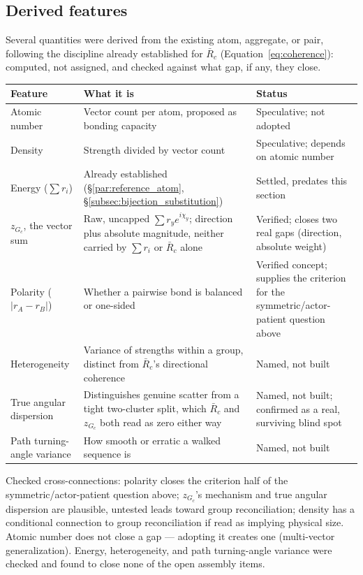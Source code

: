 \documentclass[12pt, a4paper]{article}
\begin{document}
\subsection{Derived features}
\label{subsec:assembly_features}
Several quantities were derived from the existing atom, aggregate,
or pair, following the discipline already established for $\bar
R_c$ (Equation~\eqref{eq:coherence}): computed, not assigned, and
checked against what gap, if any, they close.

\begin{center}
\begin{tabular}{lp{6.5cm}l}
\hline
Feature & What it is & Status \\
\hline
Atomic number &
  Vector count per atom, proposed as bonding capacity &
  Speculative; not adopted \\
Density &
  Strength divided by vector count &
  Speculative; depends on atomic number \\
Energy ($\sum r_i$) &
  Already established
  (\S\ref{par:reference_atom}, \S\ref{subsec:bijection_substitution}) &
  Settled, predates this section \\
$z_{G_c}$, the vector sum &
  Raw, uncapped $\sum r_y e^{i\chi_y}$; direction plus absolute
  magnitude, neither carried by $\sum r_i$ or $\bar R_c$ alone &
  Verified; closes two real gaps (direction, absolute weight) \\
Polarity ($\lvert r_A-r_B\rvert$) &
  Whether a pairwise bond is balanced or one-sided &
  Verified concept; supplies the criterion for the
  symmetric/actor-patient question above \\
Heterogeneity &
  Variance of strengths within a group, distinct from $\bar R_c$'s
  directional coherence &
  Named, not built \\
True angular dispersion &
  Distinguishes genuine scatter from a tight two-cluster split,
  which $\bar R_c$ and $z_{G_c}$ both read as zero either way &
  Named, not built; confirmed as a real, surviving blind spot \\
Path turning-angle variance &
  How smooth or erratic a walked sequence is &
  Named, not built \\
\hline
\end{tabular}
\end{center}

Checked cross-connections: polarity closes the criterion half of the
symmetric/actor-patient question above; $z_{G_c}$'s mechanism and
true angular dispersion are plausible, untested leads toward group
reconciliation; density has a conditional connection to group
reconciliation if read as implying physical size. Atomic number does
not close a gap --- adopting it creates one (multi-vector
generalization). Energy, heterogeneity, and path turning-angle
variance were checked and found to close none of the open assembly
items.
\end{document}
